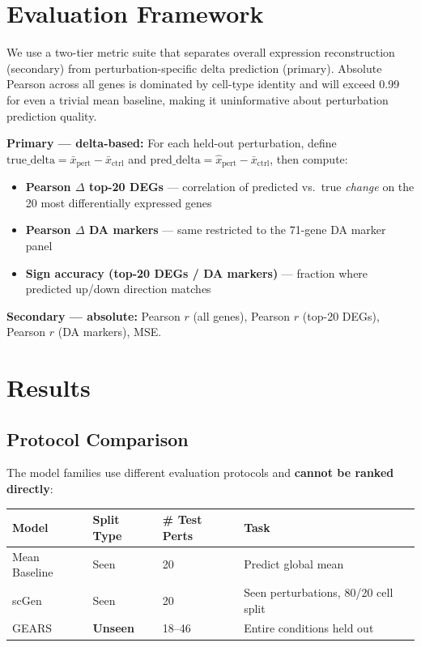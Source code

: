 \documentclass[11pt,letterpaper]{article}
\begin{document}
\section{Evaluation Framework}

We use a two-tier metric suite that separates overall expression reconstruction (secondary) from
perturbation-specific delta prediction (primary). Absolute Pearson across all genes is dominated
by cell-type identity and will exceed 0.99 for even a trivial mean baseline, making it
uninformative about perturbation prediction quality.

\textbf{Primary --- delta-based:} For each held-out perturbation, define
$\text{true\_delta} = \bar{x}_{\text{pert}} - \bar{x}_{\text{ctrl}}$ and
$\text{pred\_delta} = \hat{x}_{\text{pert}} - \bar{x}_{\text{ctrl}}$, then compute:
\begin{itemize}[noitemsep]
  \item \textbf{Pearson $\Delta$ top-20 DEGs} --- correlation of predicted vs.\ true \emph{change} on the 20 most differentially expressed genes
  \item \textbf{Pearson $\Delta$ DA markers} --- same restricted to the 71-gene DA marker panel
  \item \textbf{Sign accuracy (top-20 DEGs / DA markers)} --- fraction where predicted up/down direction matches
\end{itemize}

\textbf{Secondary --- absolute:} Pearson $r$ (all genes), Pearson $r$ (top-20 DEGs), Pearson $r$
(DA markers), MSE.

\section{Results}

\subsection{Protocol Comparison}

The model families use different evaluation protocols and \textbf{cannot be ranked directly}:

\begin{table}[h]
\centering
\small
\begin{tabular}{llll}
\toprule
Model & Split Type & \# Test Perts & Task \\
\midrule
Mean Baseline & Seen   & 20    & Predict global mean \\
scGen         & Seen   & 20    & Seen perturbations, 80/20 cell split \\
GEARS         & \textbf{Unseen} & 18--46 & Entire conditions held out \\
\bottomrule
\end{tabular}
\end{table}
\end{document}
